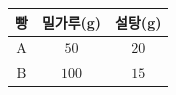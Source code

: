 \begin{tabular}{|c|c|c|}
\hline
빵 & 밀가루(g) & 설탕(g) \\
\hline
$\mathrm{A}$ & $50$ & $20$ \\
\hline
$\mathrm{B}$ & $100$ & $15$ \\
\hline
\end{tabular}
